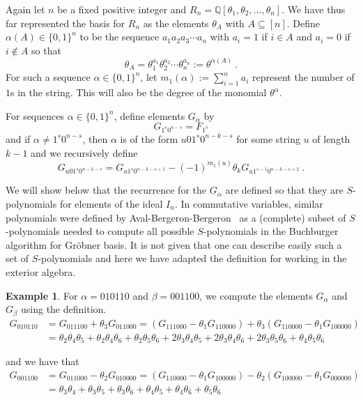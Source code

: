 \documentclass[11pt]{amsart}
\theoremstyle{definition}
\newtheorem{example}[theorem]{Example}
\numberwithin{equation}{section}
\begin{document}
Again let $n$ be a fixed positive integer and $R_n = {\mathbb Q}[\theta_1, \theta_2, \ldots, \theta_n]$.
We have thus far represented the basis for
$R_n$ as the elements $\theta_A$ with $A \subseteq [n]$.  Define $\alpha(A) \in \{ 0,1\}^n$ to be
the sequence $a_1 a_2 a_3 \cdots a_n$ with $a_i = 1$ if $i \in A$ and
$a_i = 0$ if $i \notin A$ so that
\[
\theta_A = \theta_1^{a_1} \theta_2^{a_2} \cdots \theta_n^{a_n} := \theta^{\alpha(A)}~.
\]
For such a sequence $\alpha \in \{0,1\}^n$, let $m_1(\alpha) := \sum_{i=1}^n a_i$
represent the number of $1$s in the string.  This will also be the degree of the monomial
$\theta^{\alpha}$.

For sequences $\alpha \in \{ 0, 1 \}^n$, define elements $G_\alpha$ by
\begin{equation}\label{eq:Gdef1}
G_{1^s0^{n-s}} = F_{1^s}
\end{equation}
and if $\alpha \neq 1^s 0^{n-s}$, then $\alpha$ is of the form $u01^s0^{n-k-s}$ for some string $u$
of length $k-1$ and we recursively define
\begin{equation}\label{eq:Gdef2}
G_{u01^s0^{n-k-s}} = G_{u1^s0^{n-k-s+1}} - (-1)^{m_1(u)} \theta_k G_{u1^{s-1}0^{n-k-s+2}}~.
\end{equation}

We will show below that the recurrence for the
$G_\alpha$ are defined so that they are $S$-polynomials \cite{CLO}
for elements of the ideal $I_n$.
In commutative variables, similar polynomials were defined by Aval-Bergeron-Bergeron~\cite{AB,ABB}
as a (complete) subset of $S$-polynomials needed to compute all possible
$S$-polynomials in the Buchburger algorithm for Gr\"obner basis.
It is not given that one can describe easily such a set of $S$-polynomials and here we have adapted
the definition for working in the exterior algebra.

\begin{example} For $\alpha = 010110$ and $\beta = 001100$, we compute
the elements $G_\alpha$ and $G_\beta$ using the definition.
\begin{align*}
G_{010110} &= G_{011100} + \theta_3 G_{011000} = (G_{111000} - \theta_1 G_{110000})
+ \theta_3(G_{110000} - \theta_1 G_{100000})\\
&= \theta_2 \theta_4 \theta_5 + \theta_2 \theta_4 \theta_6 + \theta_2 \theta_5 \theta_6
+ 2 \theta_3 \theta_4 \theta_5 + 2 \theta_3 \theta_4 \theta_6 + 2 \theta_3 \theta_5 \theta_6
+ \theta_4 \theta_5 \theta_6
\end{align*}

and we have that
\begin{align*}
G_{001100} &= G_{011000} - \theta_2 G_{010000} = (G_{110000} - \theta_1 G_{100000})
- \theta_2 (G_{100000} - \theta_1 G_{000000})\\
&= \theta_3 \theta_4 + \theta_3 \theta_5 + \theta_3 \theta_6 + \theta_4 \theta_5 + \theta_4 \theta_6 + \theta_5 \theta_6
\end{align*}
\end{example}
\end{document}

